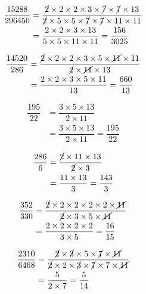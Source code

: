{{\item\begin{align*}
    \dfrac{15288}{296450} &=
    \dfrac{\cancel{2} \times 2 \times 2 \times 3 \times \cancel{7} \times \cancel{7} \times 13}
    {\cancel{2} \times 5 \times 5 \times \cancel{7} \times \cancel{7} \times 11 \times 11}\\ &=
    \dfrac{2 \times 2 \times 3 \times 13}
    {5 \times 5 \times 11 \times 11} =
    \dfrac{156}{3025}
    \end{align*}

\item\begin{align*}
    \dfrac{14520}{286} &=
    \dfrac{\cancel{2} \times 2 \times 2 \times 3 \times 5 \times \cancel{11} \times 11}
    {\cancel{2} \times \cancel{11} \times 13}\\ &=
    \dfrac{2 \times 2 \times 3 \times 5 \times 11}
    {13} =
    \dfrac{660}{13}
    \end{align*}

\item\begin{align*}
    \dfrac{195}{22} &=
    \dfrac{3 \times 5 \times 13}
    {2 \times 11}\\ &=
    \dfrac{3 \times 5 \times 13}
    {2 \times 11} =
    \dfrac{195}{22}
    \end{align*}

\item\begin{align*}
    \dfrac{286}{6} &=
    \dfrac{\cancel{2} \times 11 \times 13}
    {\cancel{2} \times 3}\\ &=
    \dfrac{11 \times 13}
    {3} =
    \dfrac{143}{3}
    \end{align*}

\item\begin{align*}
    \dfrac{352}{330} &=
    \dfrac{\cancel{2} \times 2 \times 2 \times 2 \times 2 \times \cancel{11}}
    {\cancel{2} \times 3 \times 5 \times \cancel{11}}\\ &=
    \dfrac{2 \times 2 \times 2 \times 2}
    {3 \times 5} =
    \dfrac{16}{15}
    \end{align*}

\item\begin{align*}
    \dfrac{2310}{6468} &=
    \dfrac{\cancel{2} \times \cancel{3} \times 5 \times \cancel{7} \times \cancel{11}}
    {\cancel{2} \times 2 \times \cancel{3} \times \cancel{7} \times 7 \times \cancel{11}}\\ &=
    \dfrac{5}
    {2 \times 7} =
    \dfrac{5}{14}
    \end{align*}

}}
